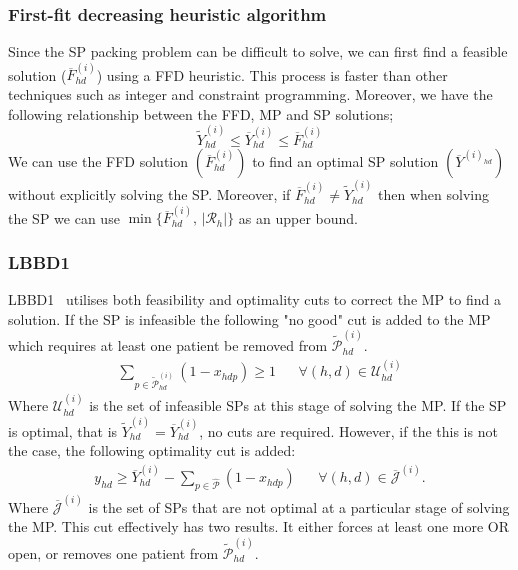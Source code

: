 \subsubsection*{First-fit decreasing heuristic algorithm}
Since the SP packing problem can be difficult to solve, we can first find a feasible solution 
($\overline{F}^{(i)}_{hd}$) using a FFD heuristic. This process is faster than other techniques
such as integer and constraint programming. Moreover, we have the following relationship 
between the FFD, MP and SP solutions;
\begin{equation}
    \tilde{Y}^{(i)}_{hd} \leq \overline{Y}^{(i)}_{hd} \leq \overline{F}^{(i)}_{hd}
\end{equation}
We can use the FFD solution $\left(\overline{F}^{(i)}_{hd}\right)$ to find an optimal SP solution 
$\left(\overline{Y}^{(i)_{hd}}\right)$ without explicitly solving the SP. Moreover, if 
$\overline{F}^{(i)}_{hd} \neq \tilde{Y}^{(i)}_{hd}$ then when solving the SP we can use 
$\operatorname{min}\{\overline{F}^{(i)}_{hd},\, |\mathcal{R}_h|\}$ as an upper bound. 

\subsubsection{LBBD1}
LBBD1~\cite{roshanaei2017propagating} utilises both feasibility and optimality cuts to 
correct the MP to find a solution. If the SP is infeasible the following "no good" cut 
is added to the MP which requires at least one patient be removed from 
$\tilde{\mathcal{P}}^{(i)}_{hd}$.
\begin{align}
    \sum\limits_{p \in \tilde{\mathcal{P}}^{(i)}_{hd}}(1-x_{hdp})\geq 1 
        && \forall (h,d) \in \mathcal{U}_{hd}^{(i)}
\end{align}
Where $\mathcal{U}_{hd}^{(i)}$ is the set of infeasible SPs at this stage of solving the MP.
If the SP is optimal, that is $\tilde{Y}^{(i)}_{hd} = \overline{Y}^{(i)}_{hd}$, no cuts
are required. However, if the this is not the case, the following optimality cut is added:
\begin{align*}
    y_{hd} \geq \overline{Y}_{hd}^{(i)} - \sum\limits_{p \in \hat{\mathcal{P}}}(1-x_{hdp}) && \forall (h,d) \in \overline{\mathcal{J}}^{(i)}.
\end{align*}
Where $\overline{\mathcal{J}}^{(i)}$ is the set of SPs that are not optimal at a particular stage of solving the MP. This cut effectively has two results. It either forces at least one more OR open, or removes one patient from $\tilde{\mathcal{P}}^{(i)}_{hd}$.
